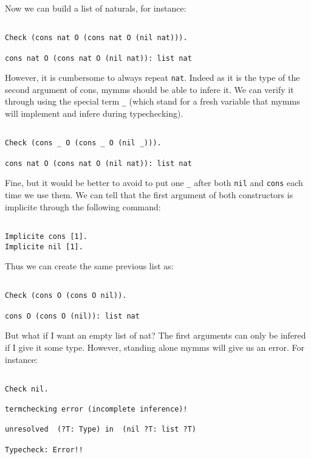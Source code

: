 \documentclass[a4paper,5pt,onecolumn]{article}
\begin{document}
Now we can build a list of naturals, for instance:

\begin{verbatim}

Check (cons nat O (cons nat O (nil nat))).

cons nat O (cons nat O (nil nat)): list nat

\end{verbatim}

However, it is cumbersome to always repeat \texttt{nat}. Indeed as it
is the type of the second argument of cons, mymms should be able to
infere it. We can verify it through using the special term \texttt{\_}
(which stand for a fresh variable that mymms will implement and infere
during typechecking).

\begin{verbatim}

Check (cons _ O (cons _ O (nil _))).

cons nat O (cons nat O (nil nat)): list nat

\end{verbatim}

Fine, but it would be better to avoid to put one \texttt{\_} after
both \texttt{nil} and \texttt{cons} each time we use them. We can tell
that the first argument of both constructors is implicite through the
following command:

\begin{verbatim}

Implicite cons [1].
Implicite nil [1].

\end{verbatim}

Thus we can create the same previous list as:

\begin{verbatim}

Check (cons O (cons O nil)).

cons O (cons O (nil)): list nat

\end{verbatim}

But what if I want an empty list of nat? The first arguments can only
be infered if I give it some type. However, standing alone mymms will
give us an error. For instance:

\begin{verbatim}

Check nil.

termchecking error (incomplete inference)!

unresolved  (?T: Type) in  (nil ?T: list ?T)

Typecheck: Error!!

\end{verbatim}
\end{document}
